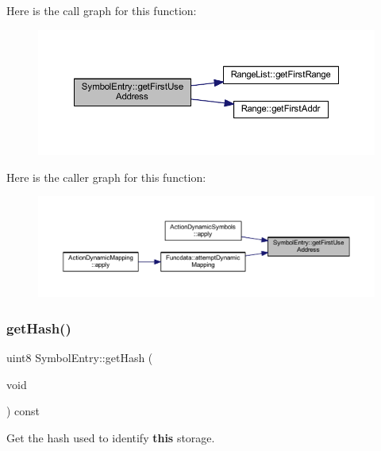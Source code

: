Here is the call graph for this function\+:
\nopagebreak
\begin{figure}[H]
\begin{center}
\leavevmode
\includegraphics[width=350pt]{class_symbol_entry_a856e7005f430c40b54c97ee886476e8a_cgraph}
\end{center}
\end{figure}
Here is the caller graph for this function\+:
\nopagebreak
\begin{figure}[H]
\begin{center}
\leavevmode
\includegraphics[width=350pt]{class_symbol_entry_a856e7005f430c40b54c97ee886476e8a_icgraph}
\end{center}
\end{figure}
\mbox{\label{class_symbol_entry_a1ed6804fa8944007d6e0685432dced73}} 
\subsubsection{\texorpdfstring{getHash()}{getHash()}}
{\footnotesize\ttfamily uint8 Symbol\+Entry\+::get\+Hash (\begin{DoxyParamCaption}\item[{void}]{ }\end{DoxyParamCaption}) const\hspace{0.3cm}{\ttfamily [inline]}}



Get the hash used to identify {\bfseries{this}} storage. 



